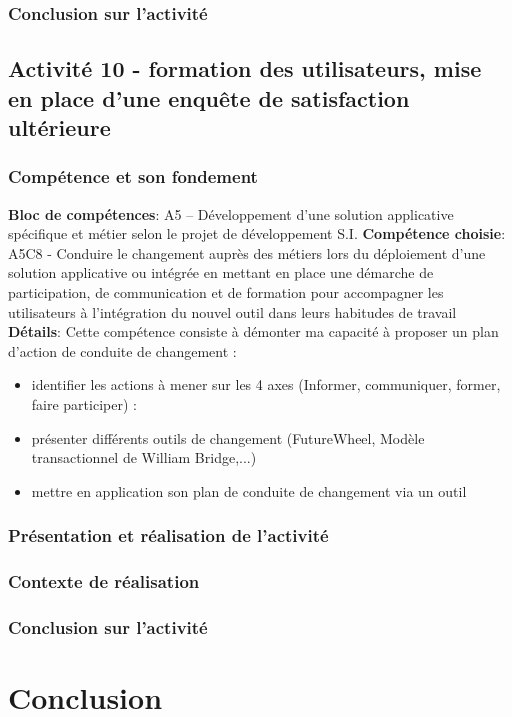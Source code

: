 \documentclass[a4paper, 11pt]{report}
\begin{document}
\subsection{Conclusion sur l'activité}

\section{Activité 10 - formation des utilisateurs, mise en place d’une enquête de satisfaction ultérieure}
\subsection{Compétence et son fondement}
\textbf{Bloc de compétences}: A5 – Développement d’une solution applicative spécifique et métier selon le projet de développement S.I.
\newline
\textbf{Compétence choisie}: A5C8 - Conduire le changement auprès des métiers lors du déploiement d’une solution applicative ou intégrée en mettant en place une démarche de participation, de communication et de formation pour accompagner les utilisateurs à l’intégration du nouvel outil dans leurs habitudes de travail
\newline
\textbf{Détails}: Cette compétence consiste à démonter ma capacité à proposer un plan d’action de conduite de changement :
\begin{itemize}
  \item identifier les actions à mener sur les 4 axes (Informer, communiquer, former, faire participer) :
  \item présenter différents outils de changement (FutureWheel, Modèle transactionnel de William Bridge,...)
  \item mettre en application son plan de conduite de changement via un outil
\end{itemize}
\subsection{Présentation et réalisation de l'activité}
\subsection{Contexte de réalisation}
\subsection{Conclusion sur l'activité}

\chapter{Conclusion}
\end{document}
